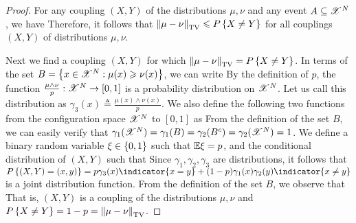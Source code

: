 \documentclass[letterpaper,english,10pt]{article}
\begin{document}
\begin{proof}
For any coupling $(X,Y)$ of the distributions $\mu, \nu$ and any event $A \subseteq \mathscr{X}^N$, we have 
Therefore, it follows that $\left\lVert\mu-\nu\right\rVert_{\text{TV}}  \leqslant P\left\{X\neq Y\right\}$ for all  couplings $(X,Y)$ of distributions $\mu, \nu$. 

Next we find a coupling $(X,Y)$ for which $ \left\lVert\mu-\nu\right\rVert_{\text{TV}} = P\left\{X \neq Y\right\}$. 
In terms of the set $B  = \left\{x \in \mathscr{X}^N: \mu(x) \geqslant \nu(x)\right\}$, we can write
By the definition of $p$, the function $\frac{\mu\wedge\nu}{p}: \mathscr{X}^N \to [0,1]$ is a probability distribution on $\mathscr{X}^N$. 
Let us call this distribution as $\gamma_3(x) \triangleq \frac{\mu(x)\wedge\nu(x)}{p}$. 
We also define the following two functions from the configuration space $\mathscr{X}^N$ to $[0,1]$ as  
From the definition of the set $B$, we can easily verify that $\gamma_1(\mathscr{X}^N) = \gamma_1(B) = \gamma_2(B^c) = \gamma_2(\mathscr{X}^N) = 1$. 
We define a binary random variable $\xi \in \left\{0,1\right\}$ such that $\mathbb{E} \xi = p$, 
and the conditional distribution of $(X,Y)$ such that 
Since $\gamma_1, \gamma_2, \gamma_3$ are distributions, it follows that $P\set{(X,Y) = (x,y)} = p\gamma_3(x)\indicator{x = y} + (1-p)\gamma_1(x)\gamma_2(y)\indicator{x\neq y}$ is a joint distribution function. 
From the definition of the set $B$, we observe that 
That is, $(X,Y)$ is a coupling of the distributions $\mu, \nu$ and $P\left\{X \neq Y\right\} = 1-p = \left\lVert\mu - \nu\right\rVert_{\text{TV}}$. 
\end{proof}
\end{document}
